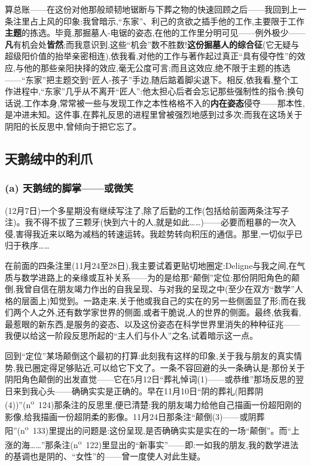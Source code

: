 算总账——在这份对他那般顽韧地锯断与下葬之物的快速回顾之后——我回到上一条注里占上风的印象:我曾暗示,“东家”、利己的贪欲之插手他的工作,主要限于工作\textbf{主题}的拣选。毕竟,那掘墓人-电锯的姿态,在他的工作里分明可见——例外极少——\textbf{凡}有机会处\textbf{皆然};而我意识到,这些“机会”数不胜数!\textbf{这份掘墓人的综合征}(它无疑与超级阳价值的抬举亲密相连),依我看,\dmark{}对他的工作与著作起过真正“具有侵夺性”的效应,与他的那些亲阳抉择的效应,毫无公度可言;而且这效应,绝不限于主题的拣选——“东家”把主题交到“匠人-孩子”手边,随后踮着脚尖退下。相反,依我看,整个工作进程中,“东家”几乎从不离开“匠人”:他太担心后者会忘记那些强制性的指令;换句话说,工作本身,常常被一些与发现工作之本性格格不入的\textbf{内在姿态}侵夺——那本性,是冲进未知。这件事,在葬礼反思的进程里曾被强烈地感到过多次;而我在这场关于阴阳的长反思中,曾倾向于把它忘了。

\subsection{天鹅绒中的利爪}
\label{ch18:local:h48}

\subsubsection*{(a) 天鹅绒的脚掌——或微笑}
\label{ch18:local:h49}

\label{ch18:local:n45}

(12月7日)一个多星期没有继续写注了,除了后勤的工作(包括给前面两条注写子注)。我不得不拔了三颗牙(快到六十的人,就是如此……)——必要而粗暴的一次入侵,害得我近来以略为减档的转速运转。我趁势转向积压的通信。那里,一切似乎已归于秩序……

在前面的四条注里(11月24至28日),我主要试着更贴切地圈定:Deligne与我之间,在气质与数学进路上的亲缘或互补关系——为的是给那“颠倒”定位:那份阴阳角色的颠倒,我曾自信在朋友竭力作出的自我呈现、与对我的呈现之中(至少在双方“数学”人格的层面上)知觉到。一路走来,关于他或我自己的实在的另一些侧面显了形;而在我们两个人之外,还有数学家世界的侧面,或者干脆说,人的世界的侧面。最终,依我看,最惹眼的新东西,是服务的姿态、以及这份姿态在科学世界里消失的种种征兆——我便以给这一阶段反思所起的“主人们与仆人”之名,试着暗示这一点。

\dmark{}回到“定位”某场颠倒这个最初的打算:此刻我有这样的印象,关于我与朋友的真实情势,我已圈定得足够贴近,可以给它下文了。一条不容回避的头一条确认是:那份关于阴阳角色颠倒的出发直觉——它在5月12日“葬礼悼词(1)——或恭维”那场反思的翌日来到我心头——确确实实是正确的。早在11月10日“阴的葬礼(阳葬阴(4))”(n\textsuperscript{o}~124)那条注的反思里,便已清楚:我的朋友竭力给他自己描画一份超阳刚的影像,给我描画一份超阴柔的影像。11月24日那条注“颠倒(3)——或阴葬阳”(n\textsuperscript{o}~133)里提出的问题是:这份呈现,是否确确实实是实在的一场“颠倒”。而“上涨的海……”那条注(n\textsuperscript{o}~122)里显出的“新事实”——即:一如我的朋友,我的数学进法的基调也是阴的、“女性”的——曾一度使人对此生疑。

